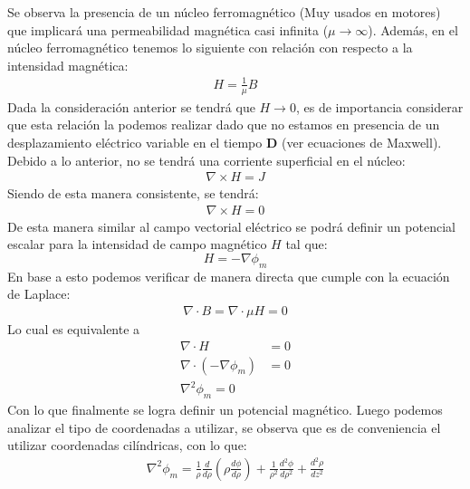 \documentclass[
  11pt,
  letterpaper,
   addpoints,
   answers
  ]{exam}
\begin{document}
\begin{questions}
\begin{solution}
\begin{enumerate}
        Se observa la presencia de un núcleo ferromagnético (Muy usados en motores) que implicará una permeabilidad magnética casi infinita ($\mu \rightarrow \infty$). Además, en el núcleo ferromagnético tenemos lo siguiente con relación con respecto a la intensidad magnética: 
        \begin{align}
            H = \frac{1}{\mu} B 
        \end{align}
        Dada la consideración anterior se tendrá que $H \rightarrow 0 $, es de importancia considerar que esta relación la podemos realizar dado que no estamos en presencia de un desplazamiento eléctrico variable en el tiempo $\textbf{D}$ (ver ecuaciones de Maxwell). Debido a lo anterior, no se tendrá una corriente superficial en el núcleo: 
        \begin{align}
            \nabla \times H = J  
        \end{align}
        Siendo de esta manera consistente, se tendrá: 
        \begin{align}
            \nabla \times H = 0  
        \end{align}
        De esta manera similar al campo vectorial eléctrico se podrá definir un potencial escalar para la intensidad de campo magnético $H$ tal que:
        \begin{equation}
            H = -\nabla \phi_{m} 
        \end{equation}
        En base a esto podemos verificar de manera directa que cumple con la ecuación de Laplace:\\
        \begin{align}
            \nabla \cdot B = \nabla \cdot \mu H= 0 
        \end{align}
        Lo cual es equivalente a 
        \begin{align}
            \nabla \cdot H &= 0\\
            \nabla \cdot (-\nabla \phi_{m}) &= 0\\
            \nabla^{2} \phi_{m}= 0 
        \end{align}
        Con lo que finalmente se logra definir un potencial magnético. Luego podemos analizar el tipo de coordenadas a utilizar, se observa que es de conveniencia el utilizar coordenadas cilíndricas, con lo que:
        \begin{align}
            \nabla^{2}\phi_{m} = \frac{1}{\rho} \frac{d}{d\rho}\left(\rho \frac{d\phi}{d\rho}\right) + \frac{1}{\rho^{2}}\frac{d^{2}\phi}{d\rho^{2}} + \frac{d^{2}\rho}{dz^{2}}
        \end{align}

\end{enumerate}
\end{solution}
\end{questions}
\end{document}
